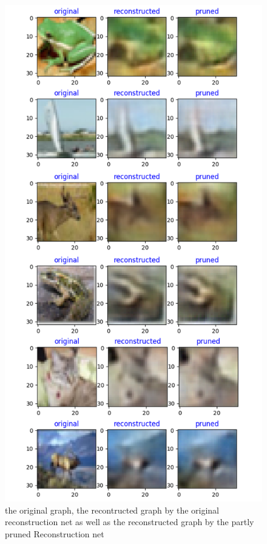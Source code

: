 \documentclass{acmtog} %
\begin{document}
\begin{figure}[!h]
  \label{fig:res0}
  \centering
  \includegraphics[scale = 0.65]{graph/exp_1.png}
  \caption{the original graph, the recontructed graph by the original reconstruction net as well as the reconstructed graph by the partly pruned Reconstruction net}
\end{figure}
\end{document}
